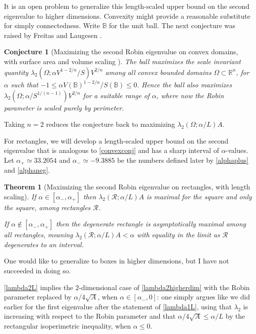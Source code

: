 \documentclass[12pt,reqno]{amsart}
\newtheorem{theorem}{Theorem}[section]
\newtheorem{conjx}{Conjecture}
\theoremstyle{definition}
\newcommand{\B}{{\mathbb B}}
\newcommand{\Rn}{{\mathbb R}^n}
\begin{document}
It is an open problem to generalize this length-scaled upper bound on the second eigenvalue to higher dimensions. Convexity might provide a reasonable substitute for simply connectedness. Write  $\B$ for the unit ball. The next conjecture was raised by Freitas and Laugesen \cite{FL18b}. 
%
\begin{conjx}[Maximizing the second Robin eigenvalue on convex domains, with surface area and volume scaling ]\label{convexconj}
The ball maximizes the scale invariant quantity $\lambda_2(\Omega;\alpha V^{1-2/n}/S) V^{2/n}$
among all convex bounded domains $\Omega \subset \Rn$, for $\alpha$ such that $-1 \leq \alpha V(\B)^{1-2/n}/S(\B) \leq 0$. Hence the ball also maximizes $\lambda_2(\Omega;\alpha/S^{1/(n-1)}) V^{2/n}$ for a suitable range of $\alpha$, where now the Robin parameter is scaled purely by perimeter. 
\end{conjx}
%
Taking $n=2$ reduces the conjecture back to maximizing $\lambda_2(\Omega;\alpha/L)A$. 

For rectangles, we will develop a length-scaled upper bound on the second eigenvalue that is analogous to \autoref{convexconj} and has a sharp interval of $\alpha$-values. Let $\alpha_+ \simeq 33.2054$ and $\alpha_- \simeq -9.3885$ be the numbers defined later by \eqref{alphaplus} and \eqref{alphaneg}.
%
\begin{theorem}[Maximizing the second Robin eigenvalue on rectangles, with length scaling]\label{lambda2L}
If $\alpha \in [\alpha_-,\alpha_+]$ then $\lambda_2(\mathcal{R};\alpha/L)A$ is maximal for the square and only the square, among rectangles $\mathcal{R}$. 

If $\alpha \notin [\alpha_-,\alpha_+]$ then the degenerate rectangle is asymptotically maximal among all rectangles,  meaning $\lambda_2(\mathcal{R};\alpha/L)A < \alpha$ with equality in the limit as $\mathcal{R}$ degenerates to an interval.
\end{theorem}
%
One would like to generalize to boxes in higher dimensions, but I have not succeeded in doing so. 

\autoref{lambda2L} implies the $2$-dimensional case of \autoref{lambda2higherdim} with the Robin parameter replaced by $\alpha/4\sqrt{A}$, when $\alpha \in [\alpha_-,0]$: one simply argues like we did earlier for the first eigenvalue after the statement of \autoref{lambda1L}, using that $\lambda_2$ is increasing with respect to the Robin parameter and that $\alpha/4\sqrt{A} \leq \alpha/L$ by the rectangular isoperimetric inequality, when $\alpha \leq 0$.
\end{document}
